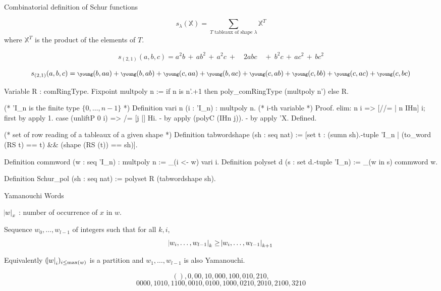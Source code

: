 \documentclass[compress,11pt]{beamer}
\newcommand{\XX}{{\mathbb X}}
\begin{document}
\begin{frame}{Combinatorial definition of Schur functions}

  \begin{DEFN}
    \[s_\lambda(\XX) = \sum_\text{$T$ tableaux of shape $\lambda$} \XX^T\]
    where $\XX^T$ is the product of the elements of $T$.
  \end{DEFN}
  \[s_{(2,1)}(a,b,c) = a^2b\,+\,ab^2\,+\,a^2c\ +\quad 2abc\quad +\
  b^2c\,+\,ac^2\,+\,bc^2\]

  \[s_{(2,1)}(a,b,c) = {  \scriptsize\young(b,aa) + \young(b,ab) + \young(c,aa)
  + \young(b,ac) + \young(c,ab) + \young(c,bb) + \young(c,ac) + \young(c,bc)}\]
\end{frame}

\begin{frame}[fragile]
\begin{coqcode}
Variable R : comRingType.
Fixpoint multpoly n :=
  if n is n'.+1 then poly_comRingType (multpoly n') else R.

(* 'I_n is the finite type $\{0, \dots, n-1\}$ *)
Definition vari n (i : 'I_n) : multpoly n. (* i-th variable *)
Proof.
  elim: n i => [//= | n IHn] i; first by apply 1.
  case (unliftP 0 i) => /= [j |] Hi.
  - by apply (polyC (IHn j)).
  - by apply 'X.
Defined.

(* set of row reading of a tableaux of a given shape *)
Definition tabwordshape (sh : seq nat) :=
  [set t : (sumn sh).-tuple 'I_n | 
     (to_word (RS t) == t) && (shape (RS (t)) == sh)].

Definition commword (w : seq 'I_n) : multpoly n := \prod_(i <- w) vari i.
Definition polyset d (s : {set d.-tuple 'I_n}) := \sum_(w in s) commword w.

Definition Schur_pol (sh : seq nat) := polyset R (tabwordshape sh).
\end{coqcode}
\end{frame}

\begin{frame}{Yamanouchi Words}

  $\abs{w}_x$ : number of occurrence of $x$ in $w$.

  \begin{DEFN}
    Sequence $w_0,\dots,w_{l-1}$ of integers such that for all $k, i$,
    \[ \abs{w_i,\dots,w_{l-1}}_k \geq \abs{w_i,\dots,w_{l-1}}_{k+1} \]

    Equivalently $(\abs{w}_i)_{i\leq\max(w)}$ is a partition and $w_1,\dots,w_{l-1}$ is
    also Yamanouchi.
  \end{DEFN}

  \[ (), 0, 00, 10, 000, 100, 010, 210, \]
  \[ 0000, 1010, 1100, 0010, 0100, 1000, 0210, 2010, 2100, 3210 \]
\end{frame}
\end{document}
